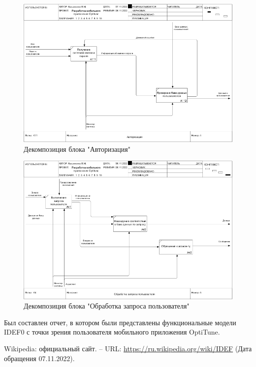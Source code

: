 \documentclass[14pt]{extreport}
\begin{document}
\begin{landscape}
\begin{figure}[H]
\centerline{\includegraphics[width=0.9\linewidth]{04_A11}}
\caption{Декомпозиция блока "Авторизация"}
\label{fig4}
\end{figure}

\begin{figure}[H]
\centerline{\includegraphics[width=0.9\linewidth]{05_A4}}
\caption{Декомпозиция блока "Обработка запроса пользователя"}
\label{fig5}
\end{figure}
\end{landscape}

\conclusions

Был составлен отчет, в котором были представлены функциональные модели IDEF0 с точки зрения пользователя мобильного приложения OptiTune.



\newpage
\begin{thebibliography}{99}

 Wikipedia: официальный сайт. – URL: \url{https://ru.wikipedia.org/wiki/IDEF} (Дата обращения 07.11.2022).

\end{thebibliography}
\end{document}
